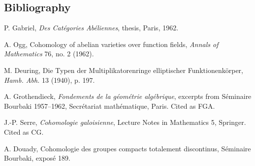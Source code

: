 \subsection*{Bibliography}
\begin{enumerate}[label={[\arabic*]}]
\item P. Gabriel, \emph{Des Cat\'egories Ab\'eliennes}, thesis, Paris, 1962.
\item A. Ogg, Cohomology of abelian varieties over function fields, \emph{Annals of Mathematics} 76, no. 2 (1962).
\item M. Deuring, Die Typen der Multiplikatorenringe elliptischer Funktionenk\"orper, \emph{Hamb. Abh.} 13 (1940), p. 197.
\item A. Grothendieck, \emph{Fondements de la g\'eom\'etrie alg\'ebrique}, excerpts from S\'eminaire Bourbaki 1957--1962, Secr\'etariat math\'ematique, Paris. Cited as FGA.
\item J.-P. Serre, \emph{Cohomologie galoisienne}, Lecture Notes in Mathematics 5, Springer. Cited as CG.
\item A. Douady, Cohomologie des groupes compacts totalement discontinus, S\'eminaire Bourbaki, expos\'e 189.
\end{enumerate}
